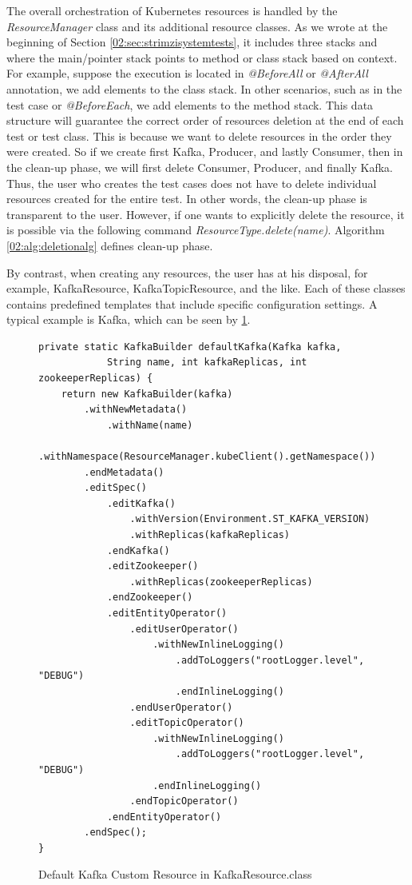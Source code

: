 The overall orchestration of Kubernetes resources is handled by the \emph{ResourceManager} class and its additional resource classes.
As we wrote at the beginning of Section \ref{02:sec:strimzisystemtests}, it includes three stacks and where the main/pointer stack points to method or class stack based on context.
For example, suppose the execution is located in \emph{@BeforeAll} or \emph{@AfterAll} annotation, we add elements to the class stack.
In other scenarios, such as in the test case or \emph{@BeforeEach}, we add elements to the method stack.
This data structure will guarantee the correct order of resources deletion at the end of each test or test class.
This is because we want to delete resources in the order they were created.
So if we create first Kafka, Producer, and lastly Consumer, then in the clean-up phase, we will first delete Consumer, Producer, and finally Kafka.
Thus, the user who creates the test cases does not have to delete individual resources created for the entire test.
In other words, the clean-up phase is transparent to the user.
However, if one wants to explicitly delete the resource, it is possible via the following command \emph{ResourceType.delete(name)}.
Algorithm \ref{02:alg:deletionalg} defines clean-up phase.


By contrast, when creating any resources, the user has at his disposal, for example, KafkaResource, KafkaTopicResource, and the like.
Each of these classes contains predefined templates that include specific configuration settings.
A typical example is Kafka, which can be seen by \ref{02:fig:kafkaresource:defaultmethod}.

\begin{figure}[!ht]
\begin{lstlisting}
private static KafkaBuilder defaultKafka(Kafka kafka,
            String name, int kafkaReplicas, int zookeeperReplicas) {
    return new KafkaBuilder(kafka)
        .withNewMetadata()
            .withName(name)
            .withNamespace(ResourceManager.kubeClient().getNamespace())
        .endMetadata()
        .editSpec()
            .editKafka()
                .withVersion(Environment.ST_KAFKA_VERSION)
                .withReplicas(kafkaReplicas)
            .endKafka()
            .editZookeeper()
                .withReplicas(zookeeperReplicas)
            .endZookeeper()
            .editEntityOperator()
                .editUserOperator()
                    .withNewInlineLogging()
                        .addToLoggers("rootLogger.level", "DEBUG")
                        .endInlineLogging()
                .endUserOperator()
                .editTopicOperator()
                    .withNewInlineLogging()
                        .addToLoggers("rootLogger.level", "DEBUG")
                    .endInlineLogging()
                .endTopicOperator()
            .endEntityOperator()
        .endSpec();
}
\end{lstlisting}
    \caption{Default Kafka Custom Resource in KafkaResource.class}
    \label{02:fig:kafkaresource:defaultmethod}
\end{figure}

